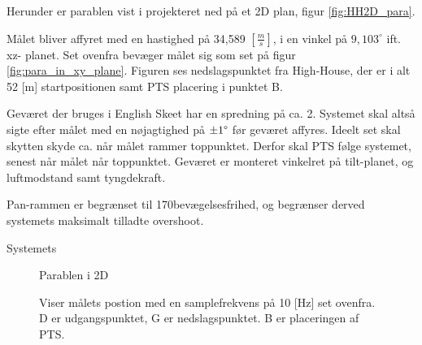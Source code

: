 Herunder er parablen vist i projekteret ned på et 
2D plan, figur \ref{fig:HH2D_para}.

Målet bliver affyret med en hastighed på 34,589 \([\frac{m}{s}]\), i en vinkel på \(9,103^{\circ}\) ift. xz-
planet. Set ovenfra bevæger målet sig som set på figur \ref{fig:para_in_xy_plane}. 
Figuren ses nedslagspunktet fra High-House, der er i alt 52 [m] startpositionen samt 
PTS placering i punktet B. 

Geværet der bruges i English Skeet har en spredning på ca. 2\degree . Systemet skal altså sigte efter målet med en nøjagtighed på $\pm 1 \degree$ før geværet affyres.
Ideelt set skal skytten skyde ca. når målet rammer toppunktet. 
Derfor skal PTS følge systemet, senest når målet når toppunktet. 
Geværet er monteret vinkelret på tilt-planet, og luftmodstand samt tyngdekraft.

Pan-rammen er begrænset til 170\degree  bevægelsesfrihed, og begrænser derved systemets maksimalt tilladte overshoot.

%
%
Systemets 



\begin{figure}[h!]
\centering
%
\caption[Målets parabel i 2 dimensioner]{Parablen i 2D}
\end{figure}



\begin{figure}[!th]
\centering
\begin{tikzpicture}[scale=2]

\end{tikzpicture}
\caption[tekst i indholdsfortegnelsen]{Viser målets postion med en samplefrekvens på 10 [Hz] set ovenfra. D er udgangspunktet, G er nedslagspunktet. B er placeringen af PTS.}
\label{fig:para_in_xyz_plane}
\end{figure}



